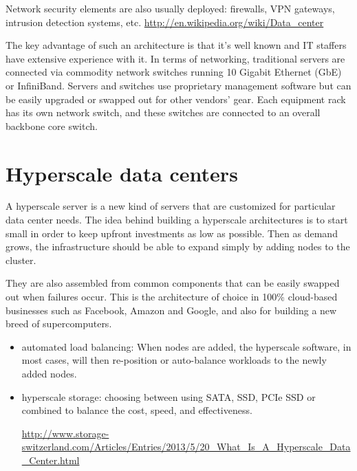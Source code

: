 Network security elements are also usually deployed: firewalls, VPN gateways,
intrusion detection systems, etc. \url{http://en.wikipedia.org/wiki/Data_center}

The key advantage of such an architecture is that it's well known and IT
staffers have extensive experience with it. In terms of networking, traditional
servers are connected via commodity network switches running 10 Gigabit Ethernet
(GbE) or InfiniBand. Servers and switches use proprietary management software
but can be easily upgraded or swapped out for other vendors' gear. Each
equipment rack has its own network switch, and these switches are connected to
an overall backbone core switch.  


\section{Hyperscale data centers}


A hyperscale server is a new kind of servers that are customized for particular
data center needs.
The idea behind building a hyperscale architectures is to start small in order
to keep upfront investments as low as possible. Then as demand grows, the
infrastructure should be able to expand simply by adding nodes to the cluster.  

They are also assembled from common components that can be
easily swapped out when failures occur. This is the architecture of choice in
100\% cloud-based businesses such as Facebook, Amazon and Google, and also for
building a new breed of supercomputers.

\begin{itemize}
  \item automated load balancing: When nodes are added, the hyperscale software, in most cases, will then
re-position or auto-balance workloads to the newly added nodes. 
  
  \item hyperscale storage: choosing between using SATA, SSD, PCIe SSD or
  combined to balance the cost, speed, and effectiveness.
  
  \url{http://www.storage-switzerland.com/Articles/Entries/2013/5/20_What_Is_A_Hyperscale_Data_Center.html}
\end{itemize}

